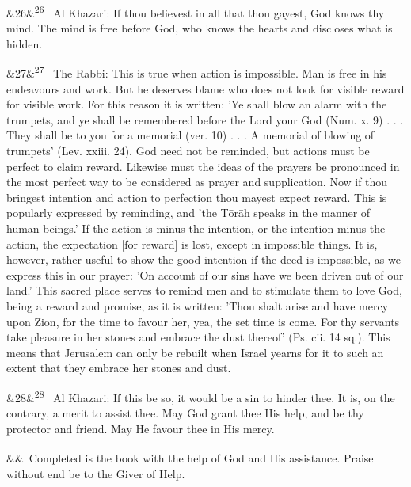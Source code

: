 \documentclass[12pt]{article}
\newcommand{\para}[1][]{\par\noindent\ifx&#1&\else\textsuperscript{\footnotesize #1}~\fi}
\begin{document}
\para[26] Al Khazari: If thou believest in all that thou gayest, God knows thy mind. The mind is free before God, who knows the hearts and discloses what is hidden.

\para[27] The Rabbi: This is true when action is impossible. Man is free in his endeavours and work. But he deserves blame who does not look for visible reward for visible work. For this reason it is written: 'Ye shall blow an alarm with the trumpets, and ye shall be remembered before the Lord your God (Num. x. 9) . . . They shall be to you for a memorial (ver. 10) . . . A memorial of blowing of trumpets' (Lev. xxiii. 24). God need not be reminded, but actions must be perfect to claim reward. Likewise must the ideas of the prayers be pronounced in the most perfect way to be considered as prayer and supplication. Now if thou bringest intention and action to perfection thou mayest expect reward. This is popularly expressed by reminding, and 'the Tōrāh speaks in the manner of human beings.' If the action is minus the intention, or the intention minus the action, the expectation [for reward] is lost, except in impossible things. It is, however, rather useful to show the good intention if the deed is impossible, as we express this in our prayer: 'On account of our sins have we been driven out of our land.' This sacred place serves to remind men and to stimulate them to love God, being a reward and promise, as it is written: 'Thou shalt arise and have mercy upon Zion, for the time to favour her, yea, the set time is come. For thy servants take pleasure in her stones and embrace the dust thereof' (Ps. cii. 14 sq.). This means that Jerusalem can only be rebuilt when Israel yearns for it to such an extent that they embrace her stones and dust.

\para[28] Al Khazari: If this be so, it would be a sin to hinder thee. It is, on the contrary, a merit to assist thee. May God grant thee His help, and be thy protector and friend. May He favour thee in His mercy.

\para Completed is the book with the help of God and His assistance. Praise without end be to the Giver of Help.
\end{document}
